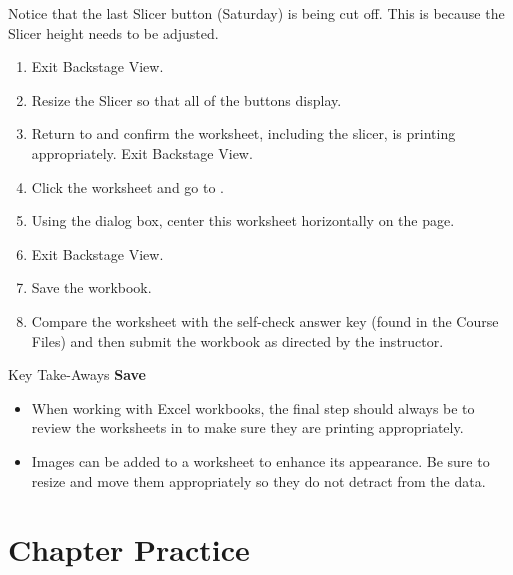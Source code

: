 Notice that the last Slicer button (Saturday) is being cut off. This is because the Slicer height needs to be adjusted.

\begin{enumerate}
	\item Exit Backstage View.
	\item Resize the Slicer so that all of the buttons display.
	\item Return to  and confirm the worksheet, including the slicer, is printing appropriately. Exit Backstage View.
	\item Click the  worksheet and go to .
	\item Using the  dialog box, center this worksheet horizontally on the page. 
	\item Exit Backstage View.
	\item Save the  workbook.
	\item Compare the worksheet with the self-check answer key (found in the Course Files) and then submit the  workbook as directed by the instructor.
\end{enumerate}

\begin{center}
	\begin{tkwbox}{Key Take-Aways}
		\textbf{Save}
		\\
		\begin{itemize}
			\setlength{\itemsep}{0pt}
			\setlength{\parskip}{0pt}
			\setlength{\parsep}{0pt}

			\item When working with Excel workbooks, the final step should always be to review the worksheets in  to make sure they are printing appropriately.
			\item Images can be added to a worksheet to enhance its appearance. Be sure to resize and move them appropriately so they do not detract from the data.

		\end{itemize}
	\end{tkwbox}
\end{center}

\section{Chapter Practice}

